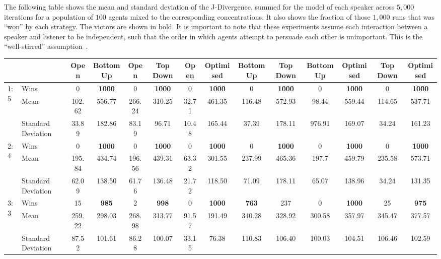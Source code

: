 The following table shows the mean and standard deviation of the J-Divergence, summed for the model of each speaker across $5,000$ iterations for a population of $100$ agents mixed to the corresponding concentrations. It also shows the fraction of those $1,000$ runs that was ``won'' by each strategy. The victors are shown in bold. It is important to note that these experiments assume each interaction between a speaker and listener to be independent, such that the order in which agents attempt to persuade each other is unimportant. This is the ``well-stirred'' assumption~\cite{Parker2009CooperativeProblem}. 

\begin{table}[H]
\begin{adjustbox}{max width = \textwidth}
\begin{tabular}{ll||cc|cc|cc|cc|cc|cc}
 &  & Open & Bottom Up & Open & Top Down & Open & Optimised & Bottom Up & Top Down & Bottom Up & Optimised & Top Down & Optimised \\ \hline \hline
\multirow{3}{*}{1:5} & Wins & 0 & \textbf{1000} & 0 & \textbf{1000} & 0 & \textbf{1000} & 0 & \textbf{1000} & 0 & \textbf{1000} & 0 & \textbf{1000} \\
 & Mean & 102.62 & 556.77 & 266.24 & 310.25 & 32.71 & 461.35 & 116.48 & 572.93 & 98.44 & 559.44 & 114.65 & 537.71 \\
 & Standard Deviation & 33.89 & 182.86 & 83.19 & 96.71 & 10.48 & 165.44 & 37.39 & 178.11 & 976.91 & 169.07 & 34.24 & 161.23 \\ \hline
\multirow{3}{*}{2:4} & Wins & 0 & \textbf{1000} & 0 & \textbf{1000} & 0 & \textbf{1000} & 0 & \textbf{1000} & 0 & \textbf{1000} & 0 & \textbf{1000} \\
 & Mean & 195.84 & 434.74 & 196.56 & 439.31 & 63.32 & 301.55 & 237.99 & 465.36 & 197.7 & 459.79 & 235.58 & 573.71 \\
 & Standard Deviation & 62.09 & 138.50 & 61.76 & 136.48 & 21.72 & 118.50 & 71.09 & 178.11 & 65.07 & 138.96 & 34.24 & 131.35 \\ \hline
\multirow{3}{*}{3:3} & Wins & 15 & \textbf{985} & 2 & \textbf{998} & 0 & \textbf{1000} & \textbf{763} & 237 & 0 & \textbf{1000} & 25 & \textbf{975} \\
 & Mean & 259.22 & 298.03 & 268.98 & 313.77 & 91.57 & 191.49 & 340.28 & 328.92 & 300.58 & 357.97 & 345.47 & 377.57 \\
 & Standard Deviation & 87.52 & 101.61 & 86.28 & 100.07 & 33.15 & 76.38 & 110.83 & 106.40 & 100.03 & 104.51 & 106.46 & 102.59 \\ \hline

\end{tabular}
\end{adjustbox}
\end{table}
